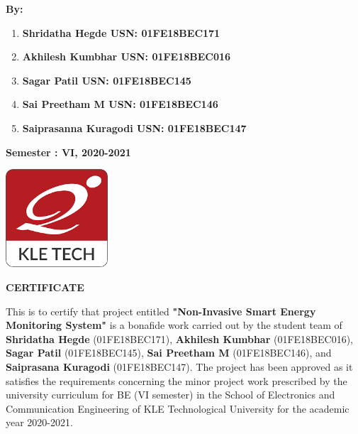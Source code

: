 \documentclass[12 pt]{report}
\begin{document}
\begin{flushleft}
\textbf{By:}
\begin{large}
\begin{enumerate}
    \item  \textbf{Shridatha Hegde                  \hspace{5cm}         USN: 01FE18BEC171 }
    \item \textbf{Akhilesh Kumbhar  \hspace{4.5cm}  USN: 01FE18BEC016}
         \item \textbf{Sagar Patil                              \hspace{6.4cm}      USN: 01FE18BEC145}
     \item \textbf{Sai Preetham M                \hspace{5cm}     USN: 01FE18BEC146}
     \item \textbf{Saiprasanna Kuragodi   \hspace{3.6cm}     USN: 01FE18BEC147}

     
\end{enumerate}
\vspace{1cm}
\end{large}

\begin{large}
\textbf{Semester : VI, 2020-2021}
\end{large}
\end{flushleft}

\begin{flushright}
\end{flushright}

\begin{center}
\includegraphics[width=1.5in]{images/certkle.png} 
\end{center}
\begin{center}
\begin{Large}
{\color {violet} \textbf{CERTIFICATE}} \linebreak
\end{Large}
\end{center}


\justify
{This is to certify that project entitled  {\textbf{"Non-Invasive Smart Energy  Monitoring System"}} is a bonafide work carried out by the student team of   \textbf{Shridatha Hegde}        (01FE18BEC171),
\textbf{Akhilesh Kumbhar}    (01FE18BEC016),
\textbf{Sagar Patil}  (01FE18BEC145), \textbf{Sai Preetham M}             (01FE18BEC146), and  \textbf{Saiprasana Kuragodi}    (01FE18BEC147).} The project has been approved as it satisfies the requirements concerning the minor project work
prescribed by the university curriculum for BE (VI semester) in the School of Electronics and
Communication Engineering of KLE Technological University for the academic year 2020-2021.
\end{document}
